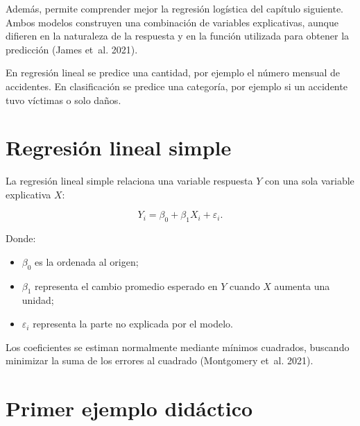 \documentclass[
  spanish,
  10.5pt,
  letterpaper,
  openany,
  headings=big]{scrbook}
\providecommand{\tightlist}{%
  \setlength{\itemsep}{0pt}\setlength{\parskip}{0pt}}
\begin{document}
Además, permite comprender mejor la regresión logística del capítulo
siguiente. Ambos modelos construyen una combinación de variables
explicativas, aunque difieren en la naturaleza de la respuesta y en la
función utilizada para obtener la predicción (James et~al. 2021).

\begin{tcolorbox}[enhanced jigsaw, arc=.35mm, bottomrule=.15mm, bottomtitle=1mm, breakable, colback=white, colbacktitle=quarto-callout-note-color!10!white, colframe=quarto-callout-note-color-frame, coltitle=black, left=2mm, leftrule=.75mm, opacityback=0, opacitybacktitle=0.6, rightrule=.15mm, title=\textcolor{quarto-callout-note-color}{\faInfo}\hspace{0.5em}{Idea central}, titlerule=0mm, toprule=.15mm, toptitle=1mm]

En regresión lineal se predice una cantidad, por ejemplo el número
mensual de accidentes. En clasificación se predice una categoría, por
ejemplo si un accidente tuvo víctimas o solo daños.

\end{tcolorbox}

\section{Regresión lineal simple}\label{regresiuxf3n-lineal-simple}

La regresión lineal simple relaciona una variable respuesta \(Y\) con
una sola variable explicativa \(X\):

\[
Y_i = \beta_0 + \beta_1 X_i + \varepsilon_i.
\]

Donde:

\begin{itemize}
\tightlist
\item
  \(\beta_0\) es la ordenada al origen;
\item
  \(\beta_1\) representa el cambio promedio esperado en \(Y\) cuando
  \(X\) aumenta una unidad;
\item
  \(\varepsilon_i\) representa la parte no explicada por el modelo.
\end{itemize}

Los coeficientes se estiman normalmente mediante mínimos cuadrados,
buscando minimizar la suma de los errores al cuadrado (Montgomery et~al.
2021).

\section{Primer ejemplo didáctico}\label{primer-ejemplo-diduxe1ctico}
\end{document}
